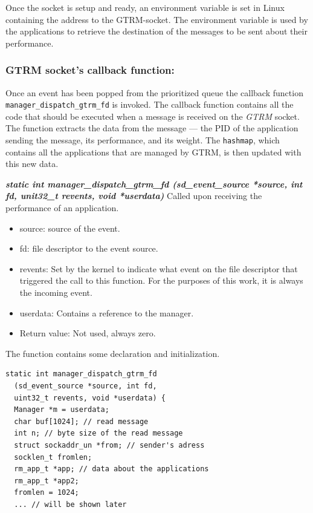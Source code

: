 \documentclass[nobiblatex]{LTHthesis}
\begin{document}
Once the socket is setup and ready, an environment variable is set in 
Linux containing the address to the GTRM-socket. The environment variable is
used by the applications to retrieve the destination of the messages to be
sent about their performance.

\subsubsection{GTRM socket's callback function:}
Once an event has been popped from the prioritized queue the callback 
function \texttt{manager\_dispatch\_gtrm\_fd} is invoked. 
The callback function contains all the code that should be executed when a
message is received on the \emph{GTRM} socket. The function extracts the data 
from the message --- the PID of the application sending the message, its
performance, and its weight. The \texttt{hashmap}, which contains all the
applications that are managed by GTRM, is then updated with this new data. 

\begin{framed}
	\begin{flushleft}
		\textbf{\emph{static int manager\_dispatch\_gtrm\_fd \newline
	  (sd\_event\_source *source, int fd, unit32\_t revents, void *userdata)}} \newline 
			Called upon receiving the performance of an application.
			\begin{itemize}
			\item source: source of the event.
			\item fd: file descriptor to the event source.
			\item revents: Set by the kernel to indicate what event on the file
		descriptor that triggered the call to this function. For the purposes
		of this work, it is always the incoming event.
			\item userdata: Contains a reference to the manager.
			\item Return value: Not used, always zero.
			\end{itemize}
	\end{flushleft}	
\end{framed}

The function contains some declaration and initialization.
\begin{lstlisting}
static int manager_dispatch_gtrm_fd
  (sd_event_source *source, int fd,
  uint32_t revents, void *userdata) {
  Manager *m = userdata;				
  char buf[1024]; // read message
  int n; // byte size of the read message
  struct sockaddr_un *from; // sender's adress
  socklen_t fromlen;
  rm_app_t *app; // data about the applications
  rm_app_t *app2;	
  fromlen = 1024;
  ... // will be shown later
\end{lstlisting}
\end{document}
